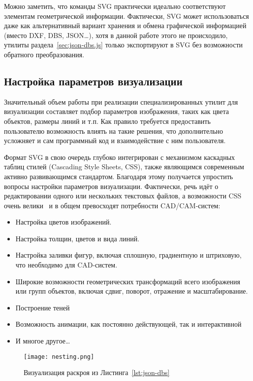 Можно заметить,
что команды SVG
практически идеально соответствуют
элементам геометрической информации.
Фактически,
SVG может использоваться даже
как альтернативный вариант
хранения и обмена графической информацией
(вместо DXF, DBS, JSON\dots),
хотя в данной работе этого не происходило,
утилиты раздела~\ref{sec:json-dbs.js}
только экспортируют в SVG
без возможности обратного преобразования.

\subsection{Настройка параметров визуализации}

Значительный объем работы при реализации
специализированных утилит для визуализации
составляет подбор параметров изображения,
таких как цвета объектов, размеры линий
и т.п.
Как правило требуется предоставить пользователю
возможность влиять на такие решения,
что дополнительно усложняет и сам программный код
и взаимодействие с ним пользователя.

Формат SVG
в свою очередь глубоко интегрирован с механизмом
каскадных таблиц стилей
(Cascading Style Sheets, CSS),
также являющимся современным
активно развивающимся стандартом.
Благодаря этому получается
упростить вопросы настройки параметров визуализации.
Фактически,
речь идёт о редактировании одного или нескольких
текстовых файлов,
а возможности CSS очень велики~\cite{bi:CSS}
и в общем превосходят
потребности CAD/CAM-систем:
\begin{itemize}
  \item Настройка цветов изображений.
  \item Настройка толщин, цветов и вида линий.
  \item Настройка заливки фигур,
  включая сплошную, градиентную
  и штриховую,
  что необходимо для CAD-систем.
  \item Широкие возможности геометрических трансформаций
  всего изображения или групп объектов,
  включая сдвиг, поворот, отражение и масштабирование.
  \item Построение теней
  \item Возможность анимации,
  как постоянно действующей,
  так и интерактивной
  \item И многое другое\dots
\end{itemize}

\begin{figure}
  \centering
  \texttt{[image: nesting.png]}
  \caption{Визуализация раскроя из Листинга~\ref{lst:json-dbs}}
  \label{fig:json-nesting}
\end{figure}

